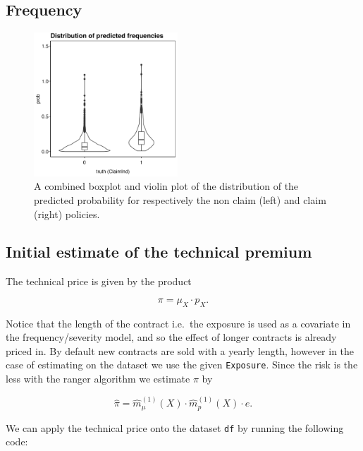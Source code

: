 \documentclass[
]{article}
\begin{document}
\hypertarget{frequency}{%
\subsection{Frequency}\label{frequency}}

\begin{figure}
  \begin{center}
    \includegraphics[width=0.48\textwidth]{figures/freq_p1.png}
  \end{center}
  \caption{A combined boxplot and violin plot of the distribution of the predicted probability for respectively the non claim (left) and claim (right) policies.}
\end{figure}

\hypertarget{initial-estimate-of-the-technical-premium}{%
\subsection{Initial estimate of the technical
premium}\label{initial-estimate-of-the-technical-premium}}

The technical price is given by the product

\[
\pi=\mu_X\cdot p_X.
\]

Notice that the length of the contract i.e.~the exposure is used as a
covariate in the frequency/severity model, and so the effect of longer
contracts is already priced in. By default new contracts are sold with a
yearly length, however in the case of estimating on the dataset we use
the given \texttt{Exposure}. Since the risk is the less with the ranger
algorithm we estimate \(\pi\) by

\[
\hat \pi=\hat m_\mu^{(1)}(X)\cdot\hat m_p^{(1)}(X)\cdot e.
\]

We can apply the technical price onto the dataset \texttt{df} by running
the following code:
\end{document}
